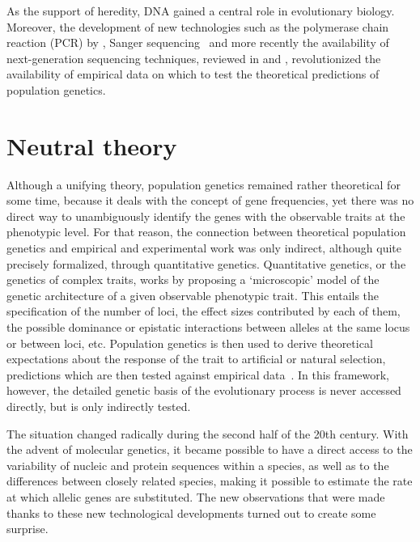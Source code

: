 As the support of heredity, \acrshort{DNA} gained a central role in evolutionary biology.
Moreover, the development of new technologies such as the polymerase chain reaction (PCR) by \citet{Kleppe1971}, Sanger sequencing~\citep{Sanger1975, Sanger1977} and more recently the availability of next-generation sequencing techniques, reviewed in \citet{Mardis2008} and \citet{Levy2016}, revolutionized the availability of empirical data on which to test the theoretical predictions of population genetics.

\section{Neutral theory}

Although a unifying theory, population genetics remained rather theoretical for some time, because it deals with the concept of gene frequencies, yet there was no direct way to unambiguously identify the genes with the observable traits at the phenotypic level.
For that reason, the connection between theoretical population genetics and empirical and experimental work was only indirect, although quite precisely formalized, through quantitative genetics.
Quantitative genetics, or the genetics of complex traits, works by proposing a ‘microscopic’ model of the genetic architecture of a given observable phenotypic trait.
This entails the specification of the number of loci, the effect sizes contributed by each of them, the possible dominance or epistatic interactions between alleles at the same locus or between loci, etc.
Population genetics is then used to derive theoretical expectations about the response of the trait to artificial or natural selection, predictions which are then tested against empirical data~\citep{Lande1976,Lande1980,Lande1983}.
In this framework, however, the detailed genetic basis of the evolutionary process is never accessed directly, but is only indirectly tested.

The situation changed radically during the second half of the 20th century.
With the advent of molecular genetics, it became possible to have a direct access to the variability of nucleic and protein sequences within a species, as well as to the differences between closely related species, making it possible to estimate the rate at which allelic genes are substituted.
The new observations that were made thanks to these new technological developments turned out to create some surprise.

